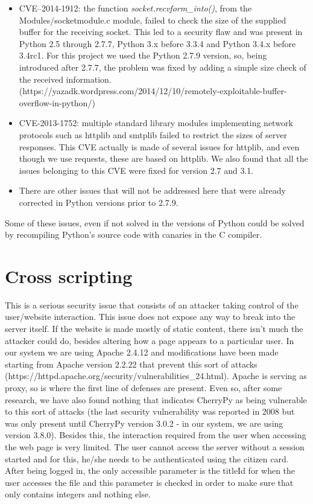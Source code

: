 \documentclass[11pt,a4paper]{report}
\begin{document}
\begin{itemize}
    \item CVE–2014-1912: the function \emph{socket.recvform\_into()}, from the Modules/socketmodule.c module, failed to check the size of the supplied buffer for the receiving socket. This led to a security flaw and was present in Python 2.5 through 2.7.7, Python 3.x before 3.3.4 and Python 3.4.x before 3.4rc1. For this project we used the Python 2.7.9 version, so, being introduced after 2.7.7, the problem was fixed by adding a simple size check of the received information. (https://yazadk.wordpress.com/2014/12/10/remotely-exploitable-buffer-overflow-in-python/)
 \item CVE-2013-1752: multiple standard library modules implementing network protocols such as httplib and smtplib failed to restrict the sizes of server responses. This CVE actually is made of several issues for httplib, and even though we use requests, these are based on httplib. We also found that all the issues belonging to this CVE were fixed for version 2.7 and 3.1.
 \item There are other issues that will not be addressed here that were already corrected in Python versions prior to 2.7.9.
\end{itemize}

Some of these issues, even if not solved in the versions of Python could be solved by recompiling Python's source code with canaries in the C compiler.

\section{Cross scripting}
This is a serious security issue that consists of an attacker taking control of the user/website interaction.
This issue does not expose any way to break into the server itself. 
If the website is made mostly of static content, there isn't much the attacker could do, besides altering how a page appears to a particular user.
\newline
In our system we are using Apache 2.4.12 and modifications have been made starting from Apache version 2.2.22 that prevent this sort of attacks (https://httpd.apache.org/security/vulnerabilities\_24.html).
\newline
Apache is serving as proxy, so is where the first line of defenses are present. Even so, after some research, we have also found nothing that indicates CherryPy as being vulnerable to this sort of attacks (the last security vulnerability was reported in 2008 but was only present until CherryPy version 3.0.2 - in our system, we are using version 3.8.0).
\newline
Besides this, the interaction required from the user when accessing the web page is very limited. The user cannot access the server without a session started and for this, he/she needs to be authenticated using the citizen card. After being logged in, the only accessible parameter is the titleId for when the user accesses the file and this parameter is checked in order to make sure that only contains integers and nothing else.
\end{document}
